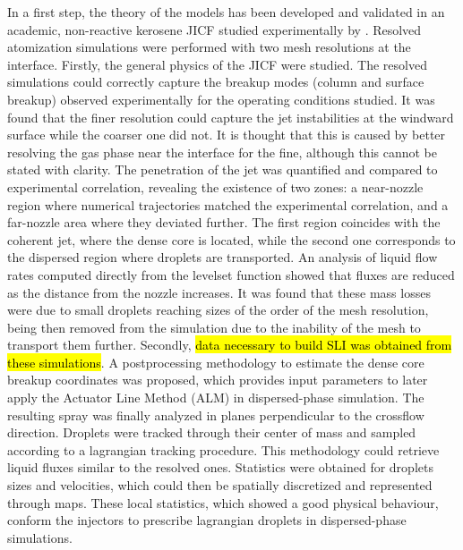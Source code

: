 In a first step, the theory of the models has been developed and validated in an academic, non-reactive kerosene JICF studied experimentally by . Resolved atomization simulations were performed with two mesh resolutions at the interface. Firstly, the general physics of the JICF were studied. The resolved simulations could correctly capture the breakup modes (column and surface breakup) observed experimentally for the operating conditions studied. It was found that the finer resolution could capture the jet instabilities at the windward surface while the coarser one did not. It is thought that this is caused by better resolving the gas phase near the interface for the fine, {although this cannot be stated with clarity}. The penetration of the jet was quantified and compared to experimental correlation, revealing the existence of two zones: a near-nozzle region where numerical trajectories matched the experimental correlation, and a far-nozzle area where they deviated further. The first region coincides with the coherent jet, where the dense core is located, while the second one corresponds to the dispersed region where droplets are transported. An analysis of liquid flow rates computed directly from the levelset function showed that fluxes are reduced as the distance from the nozzle increases. It was found that these mass losses were due to small droplets reaching sizes of the order of the mesh resolution, being then removed from the simulation due to the inability of the mesh to transport them further. Secondly, \hl{data necessary to build SLI was obtained from these simulations}. A postprocessing methodology to estimate the dense core breakup coordinates was proposed, which provides input parameters to  later apply the Actuator Line Method (ALM) in dispersed-phase simulation. The resulting spray was finally analyzed in planes perpendicular to the crossflow direction. Droplets were tracked through their center of mass and sampled according to a lagrangian tracking procedure. This methodology could retrieve liquid fluxes similar to the resolved ones. Statistics were obtained for droplets sizes and velocities, which could then be spatially discretized and represented through maps. These local statistics, which showed a good physical behaviour, conform the injectors to prescribe lagrangian droplets in dispersed-phase simulations. \\

